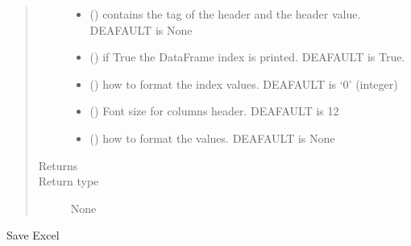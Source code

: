 \documentclass[letterpaper,10pt,english]{sphinxmanual}
\begin{document}
\begin{fulllineitems}
\begin{fulllineitems}
\begin{quote}
\begin{description}
\begin{itemize}
\item {} 
\sphinxAtStartPar
{} (\sphinxstyleliteralemphasis{\sphinxupquote{ (}}\sphinxstyleliteralemphasis{\sphinxupquote{, }}\sphinxstyleliteralemphasis{\sphinxupquote{)}}) \textendash{} contains the tag of the header and the header value. DEAFAULT is
None

\item {} 
\sphinxAtStartPar
{} () \textendash{} if True the DataFrame index is printed. DEAFAULT is True.

\item {} 
\sphinxAtStartPar
{} () \textendash{} how to format the index values. DEAFAULT is ‘0’ (integer)

\item {} 
\sphinxAtStartPar
{} () \textendash{} Font size for columns header. DEAFAULT is 12

\item {} 
\sphinxAtStartPar
{} () \textendash{} how to format the values. DEAFAULT is None

\end{itemize}

\item[{Returns}] \leavevmode
\sphinxAtStartPar


\item[{Return type}] \leavevmode
\sphinxAtStartPar
None

\end{description}\end{quote}

\end{fulllineitems}


\begin{fulllineitems}
\label{\detokenize{api/postprocessing:output.ExcelOutputSheet.save}}
\sphinxAtStartPar
Save Excel

\end{fulllineitems}


\end{fulllineitems}
\end{document}

